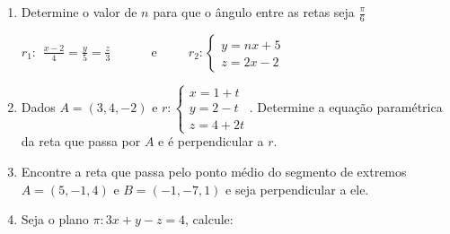 \documentclass{article}
\begin{document}
\begin{enumerate}
\begin{enumerate}
	\item
		$r_1:\left\{\begin{array}{l}
			x = -2 -t \\
			y = t \\
			z = 3 - 2t
		\end{array}\right.$
	\ \ \ \ \ e\ \ \ \ \ 
		$r_2:\begin{array}{l}
			\frac{x}{2} = y+6 = z-1
		\end{array}$
	\item
		$r_1:\left\{\begin{array}{l}
			x = 1 + \sqrt{2}t \\
			y = t \\
			z = 5 - 3t
		\end{array}\right.$
	\ \ \ \ \ e\ \ \ \ \ 
		$r_2:\left\{\begin{array}{l}
			x = 3 \\
			y = 2
		\end{array}\right.$
\end{enumerate}

\item Determine o valor de $n$ para que o \^angulo entre as retas seja $\frac{\pi}{6}$

$r_1:\begin{array}{l}
	\frac{x-2}{4} = \frac{y}{5} = \frac{z}{3}
\end{array}$
\ \ \ \ \ e\ \ \ \ \ 
$r_2:\left\{\begin{array}{l}
	y = nx + 5 \\
	z = 2x - 2
\end{array}\right.$

\item Dados $A = (3, 4, -2)$ e 
$r:\left\{\begin{array}{l}
	x = 1 + t \\
	y = 2 - t \\
	z = 4 + 2t
\end{array}\right.$. Determine a equa\c{c}\~ao param\'etrica da reta que passa por $A$ e \'e perpendicular a $r$.

\item Encontre a reta que passa pelo ponto m\'edio do segmento de extremos $A = (5, -1, 4)$ e $B = (-1, -7, 1)$ e seja perpendicular a ele.

\item Seja o plano $\pi: 3x + y -z = 4$, calcule:


\end{enumerate}
\end{document}
